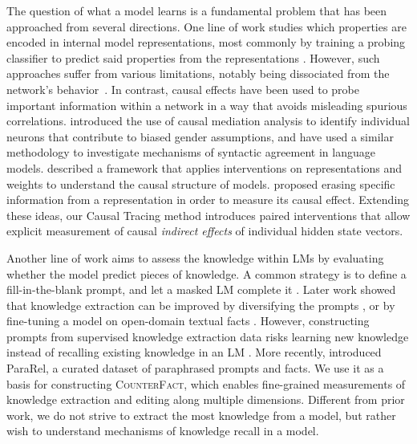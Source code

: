\documentclass{article}
\newcommand{\cfd}{\textsc{CounterFact}\xspace}
\begin{document}
The question of what a model learns is a fundamental problem that has been approached from several directions. One line of work studies which properties are encoded in internal model representations, most commonly by training a probing classifier to predict said properties from the representations \citep[][inter alia]{ettinger-etal-2016-probing,adi:2017:ICLR,hupkes2018visualisation,conneau-etal-2018-cram,belinkov-etal-2017-neural,belinkov-glass-2019-analysis}. 
However, such approaches  suffer from various limitations, notably being 
 dissociated from the network's behavior~\citep{10.1162/coli_a_00422}. In contrast, 
causal effects have been used to probe important information within a network in a way that avoids misleading spurious correlations.
\citet{vig2020investigating,vig2020causal} introduced the use of causal mediation analysis to identify individual neurons that contribute to biased gender assumptions, and \citet{finlayson-etal-2021-causal} have used a similar methodology to investigate mechanisms of syntactic agreement in language models. 
\citet{feder2021causalm} described a framework that applies interventions on representations and weights to understand the causal structure of models.
\citet{elazar2021amnesic} proposed erasing specific information from a representation in order to measure its causal effect.
Extending these ideas, our Causal Tracing method introduces paired interventions that allow explicit measurement of causal \emph{indirect effects} \citep{pearl2001direct} of individual hidden state vectors.%

Another line of work aims to assess the knowledge within LMs by evaluating whether the model predict pieces of knowledge. A common strategy is to define a fill-in-the-blank prompt, and let a masked LM complete it \citep{petroni-etal-2019-language,petroni2020context}. Later work showed that knowledge extraction can be improved by diversifying the prompts \citep{jiang-etal-2020-know,zhong-etal-2021-factual}, or by fine-tuning a model on open-domain textual facts \citep{roberts-etal-2020-much}. However, constructing prompts from supervised knowledge extraction data risks learning new knowledge instead of recalling existing knowledge in an LM \citep{zhong-etal-2021-factual}. More recently, \citet{10.1162/tacl_a_00410} introduced ParaRel, a curated dataset of paraphrased prompts and facts. We use it as a basis for constructing \cfd, which enables fine-grained measurements of knowledge extraction and editing along multiple dimensions. 
Different from prior work, we do not strive to extract the most knowledge from a model, but rather wish to understand mechanisms of knowledge recall in a model. 
\end{document}
